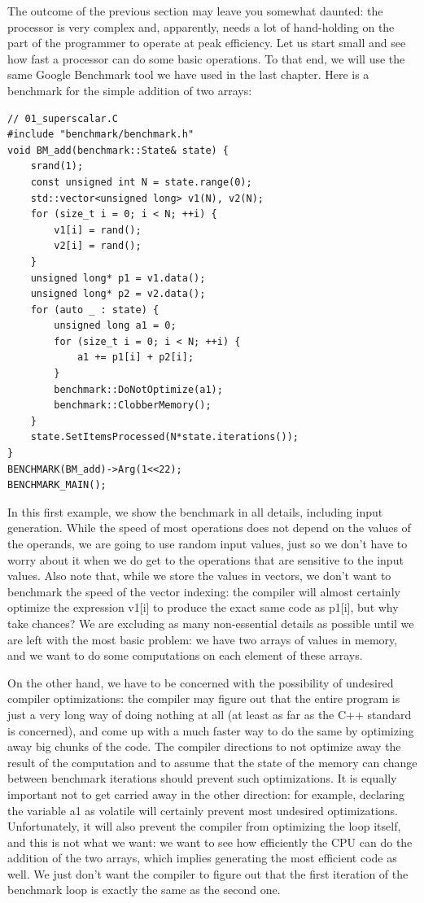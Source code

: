 
The outcome of the previous section may leave you somewhat daunted: the processor is very complex and, apparently, needs a lot of hand-holding on the part of the programmer to operate at peak efficiency. Let us start small and see how fast a processor can do some basic operations. To that end, we will use the same Google Benchmark tool we have used in the last chapter. Here is a benchmark for the simple addition of two arrays:

\begin{lstlisting}[style=styleCXX]
// 01_superscalar.C
#include "benchmark/benchmark.h"
void BM_add(benchmark::State& state) {
	srand(1);
	const unsigned int N = state.range(0);
	std::vector<unsigned long> v1(N), v2(N);
	for (size_t i = 0; i < N; ++i) {
		v1[i] = rand();
		v2[i] = rand();
	}
	unsigned long* p1 = v1.data();
	unsigned long* p2 = v2.data();
	for (auto _ : state) {
		unsigned long a1 = 0;
		for (size_t i = 0; i < N; ++i) {
			a1 += p1[i] + p2[i];
		}
		benchmark::DoNotOptimize(a1);
		benchmark::ClobberMemory();
	}
	state.SetItemsProcessed(N*state.iterations());
}
BENCHMARK(BM_add)->Arg(1<<22);
BENCHMARK_MAIN();
\end{lstlisting}

In this first example, we show the benchmark in all details, including input generation. While the speed of most operations does not depend on the values of the operands, we are going to use random input values, just so we don't have to worry about it when we do get to the operations that are sensitive to the input values. Also note that, while we store the values in vectors, we don't want to benchmark the speed of the vector indexing: the compiler will almost certainly optimize the expression v1[i] to produce the exact same code as p1[i], but why take chances? We are excluding as many non-essential details as possible until we are left with the most basic problem: we have two arrays of values in memory, and we want to do some computations on each element of these arrays.

On the other hand, we have to be concerned with the possibility of undesired compiler optimizations: the compiler may figure out that the entire program is just a very long way of doing nothing at all (at least as far as the C++ standard is concerned), and come up with a much faster way to do the same by optimizing away big chunks of the code. The compiler directions to not optimize away the result of the computation and to assume that the state of the memory can change between benchmark iterations should prevent such optimizations. It is equally important not to get carried away in the other direction: for example, declaring the variable a1 as volatile will certainly prevent most undesired optimizations. Unfortunately, it will also prevent the compiler from optimizing the loop itself, and this is not what we want: we want to see how efficiently the CPU can do the addition of the two arrays, which implies generating the most efficient code as well. We just don't want the compiler to figure out that the first iteration of the benchmark loop is exactly the same as the second one.

